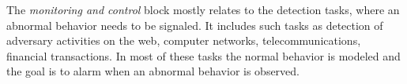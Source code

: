 \documentclass{llncs}
\begin{document}



The \emph{monitoring and control} block mostly relates to the detection tasks, where an abnormal behavior needs to be signaled.
It includes such tasks as detection of adversary activities on the web,
computer networks,
telecommunications,
financial transactions.
In most of these tasks the normal behavior is modeled and the goal is to alarm when an abnormal behavior is observed.
\end{document}
